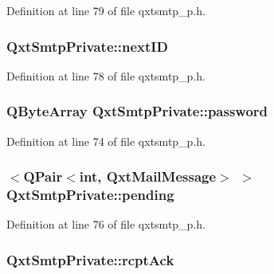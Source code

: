 Definition at line 79 of file qxtsmtp\-\_\-p.\-h.

\hypertarget{class_qxt_smtp_private_a18e3db2a31aa5d8652ec03c3fff4511c}{
\subsubsection[{next\-I\-D}]{ Qxt\-Smtp\-Private\-::next\-I\-D}}\label{class_qxt_smtp_private_a18e3db2a31aa5d8652ec03c3fff4511c}


Definition at line 78 of file qxtsmtp\-\_\-p.\-h.

\hypertarget{class_qxt_smtp_private_a5d5ba88d1e4a5c081bcf85a45274cd79}{
\subsubsection[{password}]{\setlength{\rightskip}{0pt plus 5cm}Q\-Byte\-Array Qxt\-Smtp\-Private\-::password}}\label{class_qxt_smtp_private_a5d5ba88d1e4a5c081bcf85a45274cd79}


Definition at line 74 of file qxtsmtp\-\_\-p.\-h.

\hypertarget{class_qxt_smtp_private_aee4dfcb292371e56fa55810e986ba6c7}{
\subsubsection[{pending}]{$<$Q\-Pair$<${\bf int}, {\bf Qxt\-Mail\-Message}$>$ $>$ Qxt\-Smtp\-Private\-::pending}}\label{class_qxt_smtp_private_aee4dfcb292371e56fa55810e986ba6c7}


Definition at line 76 of file qxtsmtp\-\_\-p.\-h.

\hypertarget{class_qxt_smtp_private_a28de6f0c7c76aaa7ea02fef26d73ae2e}{
\subsubsection[{rcpt\-Ack}]{ Qxt\-Smtp\-Private\-::rcpt\-Ack}}\label{class_qxt_smtp_private_a28de6f0c7c76aaa7ea02fef26d73ae2e}


